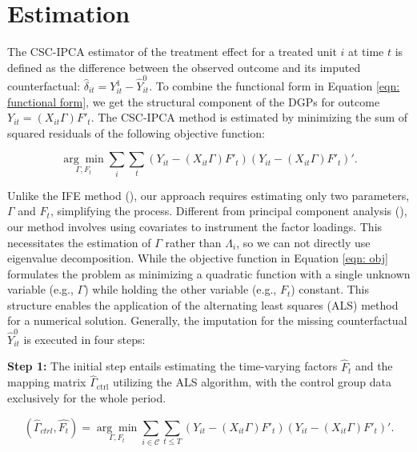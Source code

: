 \documentclass[12pt]{article}
\begin{document}
\section{Estimation} 
\label{sec: estimation}
The CSC-IPCA estimator of the treatment effect for a treated unit $i$ at time $t$ is defined as the difference between the observed outcome and its imputed counterfactual: $\hat{\delta}_{it} = Y_{it}^1 - \hat{Y}_{it}^0$. To combine the functional form in Equation \ref{eqn: functional form}, we get the structural component of the DGPs for outcome $Y_{it} = (X_{it}\Gamma) F'_{t}$. The CSC-IPCA method is estimated by minimizing the sum of squared residuals of the following objective function:

\begin{equation}
\label{eqn: obj}
\underset{\Gamma, F_t}{\arg\min} \sum_{i} \sum_{t}\left( Y_{it} - (X_{it}\Gamma) F'_{t} \right)\left( Y_{it} - (X_{it}\Gamma) F'_{t} \right)'.
\end{equation}

Unlike the IFE method (\cite{bai2009panel,xu2017generalized}), our approach requires estimating only two parameters, $\Gamma$ and $F_t$, simplifying the process. Different from principal component analysis (\cite{jolliffe2002principal,stock2002forecasting}), our method involves using covariates to instrument the factor loadings. This necessitates the estimation of $\Gamma$ rather than $\Lambda_i$, so we can not directly use eigenvalue decomposition. While the objective function in Equation \ref{eqn: obj} formulates the problem as minimizing a quadratic function with a single unknown variable (e.g., $\Gamma$) while holding the other variable (e.g., $F_t$) constant. This structure enables the application of the alternating least squares (ALS) method for a numerical solution. Generally, the imputation for the missing counterfactual $\hat{Y}_{it}^0$ is executed in four steps:

\textbf{Step 1:} The initial step entails estimating the time-varying factors $\hat{F}_t$ and the mapping matrix $\hat{\Gamma}_{\text{ctrl}}$ utilizing the ALS algorithm, with the control group data exclusively for the whole period.

\begin{equation}
(\hat{\Gamma}_{ctrl}, \hat{F_t}) = \underset{\Gamma, F_t}{\arg\min} \sum_{i \in \mathcal{C}} \sum_{t \leq T}\left( Y_{it} - (X_{it}\Gamma) F'_{t} \right)\left( Y_{it} - (X_{it}\Gamma) F'_{t} \right)'.
\label{eq: optimization}
\end{equation}
\end{document}
